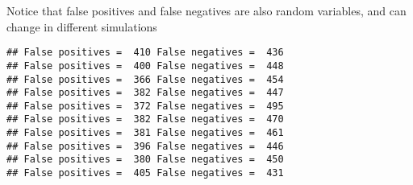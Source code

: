 \documentclass[]{article}
\newenvironment{Shaded}{\begin{snugshade}}{\end{snugshade}}
\newcommand{\CharTok}[1]{\textcolor[rgb]{0.31,0.60,0.02}{#1}}
\newcommand{\CommentTok}[1]{\textcolor[rgb]{0.56,0.35,0.01}{\textit{#1}}}
\newcommand{\ControlFlowTok}[1]{\textcolor[rgb]{0.13,0.29,0.53}{\textbf{#1}}}
\newcommand{\DecValTok}[1]{\textcolor[rgb]{0.00,0.00,0.81}{#1}}
\newcommand{\KeywordTok}[1]{\textcolor[rgb]{0.13,0.29,0.53}{\textbf{#1}}}
\newcommand{\NormalTok}[1]{#1}
\newcommand{\OperatorTok}[1]{\textcolor[rgb]{0.81,0.36,0.00}{\textbf{#1}}}
\newcommand{\StringTok}[1]{\textcolor[rgb]{0.31,0.60,0.02}{#1}}
\begin{document}
Notice that false positives and false negatives are also random
variables, and can change in different simulations

\begin{Shaded}
\end{Shaded}

\begin{verbatim}
## False positives =  410 False negatives =  436 
## False positives =  400 False negatives =  448 
## False positives =  366 False negatives =  454 
## False positives =  382 False negatives =  447 
## False positives =  372 False negatives =  495 
## False positives =  382 False negatives =  470 
## False positives =  381 False negatives =  461 
## False positives =  396 False negatives =  446 
## False positives =  380 False negatives =  450 
## False positives =  405 False negatives =  431
\end{verbatim}
\end{document}
